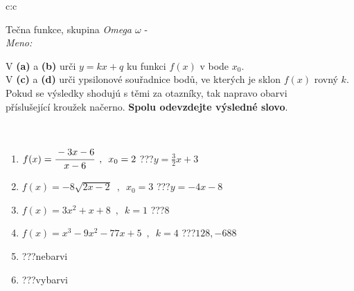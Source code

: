 \documentclass[10pt]{report}
\begin{document}
\newpage
\thispagestyle{empty}
\begin{tabular}{c:c}
\begin{minipage}[c][104.5mm][t]{0.5\linewidth}
\begin{center}
\vspace{7mm}
{\huge Tečna funkce, skupina \textit{Omega $\omega$} -}\\[5mm]
\textit{Meno:}\phantom{xxxxxxxxxxxxxxxxxxxxxxxxxxxxxxxxxxxxxxxxxxxxxxxxxxxxxxxxxxxxxxxxx}\\[5mm]
\begin{minipage}{0.95\linewidth}
\begin{center}
V \textbf{(a)} a \textbf{(b)} urči  $y = kx + q$ ku funkci $f(x)$ v bode $x_0$.\\V \textbf{(c)} a \textbf{(d)} urči ypsilonové souřadnice bodů, ve kterých je sklon $f(x)$ rovný $k$.\\Pokud se výsledky shodujú s těmi za otazníky, tak napravo obarvi\\příslušející kroužek načerno. \textbf{Spolu odevzdejte výsledné slovo}.
\end{center}
\end{minipage}
\\[1mm]
\begin{minipage}{0.79\linewidth}
\begin{center}
\begin{varwidth}{\linewidth}
\begin{enumerate}
\small
\item $f(x)=\cfrac{-3x-6}{x-6}\enspace , \enspace x_0=2$\quad \dotfill\; ???\;\dotfill \quad $y = \frac{3}{2}x+3$
\item $f(x)=-8\sqrt{2x-2}\enspace , \enspace x_0=3$\quad \dotfill\; ???\;\dotfill \quad $y = -4x-8$
\item $f(x)=3x^2+x+8\enspace , \enspace k=1$\quad \dotfill\; ???\;\dotfill \quad $8$
\item $f(x)=x^3-9x^2-77x+5\enspace , \enspace k=4$\quad \dotfill\; ???\;\dotfill \quad $128 , -688$
\item \quad \dotfill\; ???\;\dotfill \quad nebarvi
\item \quad \dotfill\; ???\;\dotfill \quad vybarvi
\end{enumerate}
\end{varwidth}
\end{center}
\end{minipage}
\begin{minipage}{0.20\linewidth}
\begin{center}

\end{center}
\end{minipage}
\end{center}
\end{minipage}
\end{tabular}
\end{document}

